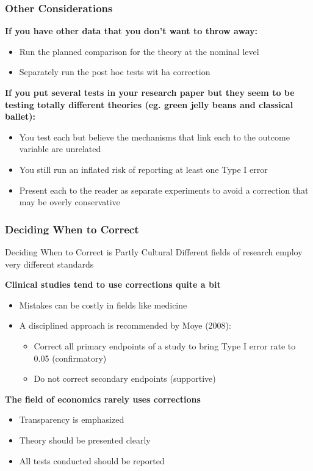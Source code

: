 \documentclass[10pt, block=fill]{beamer}
\begin{document}
\begin{frame}
  \frametitle{Other Considerations}
  
  \textbf{If you have other data that you don't want to throw away:}
  \begin{itemize}
    \item Run the planned comparison for the theory at the nominal level
    \item Separately run the post hoc tests wit ha correction
  \end{itemize}
 
 \vspace{0.2in}
 
  \textbf{If you put several tests in your research paper but they seem to be testing totally different theories (eg. green jelly beans and classical ballet):}
  \begin{itemize}
    \item You test each but believe the mechanisms that link each to the outcome variable are unrelated
    \item You still run an inflated risk of reporting at least one Type I error
    \item Present each to the reader as separate experiments to avoid a correction that may be overly conservative
  \end{itemize}
    
\end{frame}


\begin{frame}
  \frametitle{Deciding When to Correct}
  
  \begin{block}{Deciding When to Correct is Partly Cultural}
    Different fields of research employ very different standards
  \end{block}

  \textbf{Clinical studies tend to use corrections quite a bit}
  \begin{itemize}
    \item Mistakes can be costly in fields like medicine
    \item A disciplined approach is recommended by Moye (2008):
    \begin{itemize}
      \item Correct all primary endpoints of a study to bring Type I error rate to 0.05 (confirmatory)
      \item Do not correct secondary endpoints (supportive)
    \end{itemize}
  \end{itemize}
  
  \vspace{0.2in} 
  
  \textbf{The field of economics rarely uses corrections}
  \begin{itemize}
    \item Transparency is emphasized
    \item Theory should be presented clearly
    \item All tests conducted should be reported
  \end{itemize}
  
\end{frame}
\end{document}
